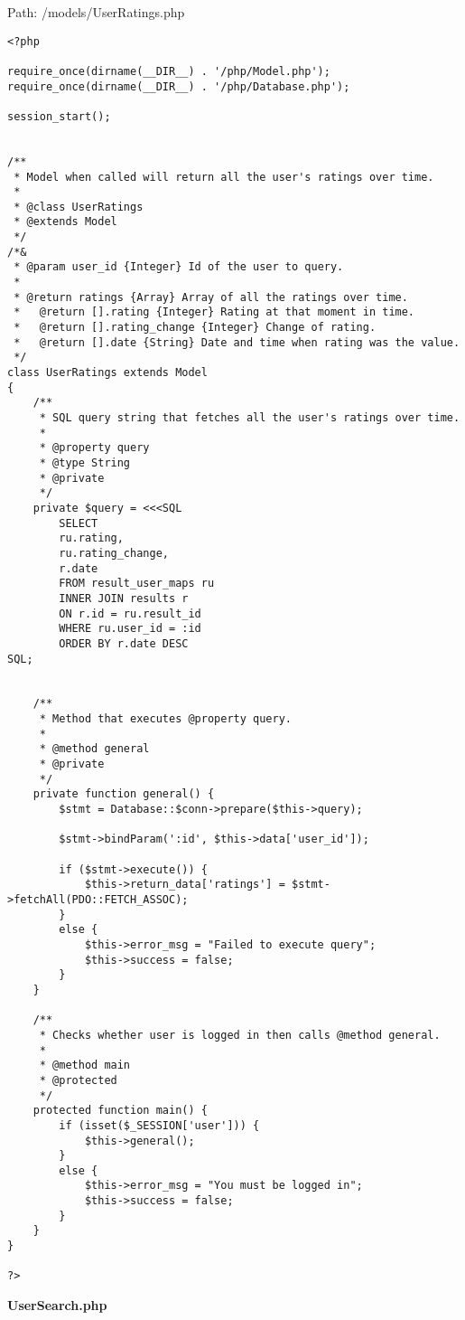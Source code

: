 Path: /models/UserRatings.php
{\scriptsize
\begin{lstlisting}
<?php

require_once(dirname(__DIR__) . '/php/Model.php');
require_once(dirname(__DIR__) . '/php/Database.php');

session_start();


/**
 * Model when called will return all the user's ratings over time.
 *
 * @class UserRatings
 * @extends Model
 */
/*&
 * @param user_id {Integer} Id of the user to query.
 *
 * @return ratings {Array} Array of all the ratings over time.
 *   @return [].rating {Integer} Rating at that moment in time.
 *   @return [].rating_change {Integer} Change of rating.
 *   @return [].date {String} Date and time when rating was the value.
 */
class UserRatings extends Model
{
	/**
	 * SQL query string that fetches all the user's ratings over time.
	 *
	 * @property query
	 * @type String
	 * @private
	 */
	private $query = <<<SQL
		SELECT
		ru.rating,
		ru.rating_change,
		r.date
		FROM result_user_maps ru
		INNER JOIN results r
		ON r.id = ru.result_id
		WHERE ru.user_id = :id
		ORDER BY r.date DESC
SQL;


	/**
	 * Method that executes @property query.
	 *
	 * @method general
	 * @private
	 */
	private function general() {
		$stmt = Database::$conn->prepare($this->query);

		$stmt->bindParam(':id', $this->data['user_id']);

		if ($stmt->execute()) {
			$this->return_data['ratings'] = $stmt->fetchAll(PDO::FETCH_ASSOC);
		}
		else {
			$this->error_msg = "Failed to execute query";
			$this->success = false;
		}
	}

	/**
	 * Checks whether user is logged in then calls @method general.
	 *
	 * @method main
	 * @protected
	 */
	protected function main() {
		if (isset($_SESSION['user'])) {
			$this->general();
		}
		else {
			$this->error_msg = "You must be logged in";
			$this->success = false;
		}
	}
}

?>\end{lstlisting}
}
\textbf{UserSearch.php}\label{UserSearch.php}

